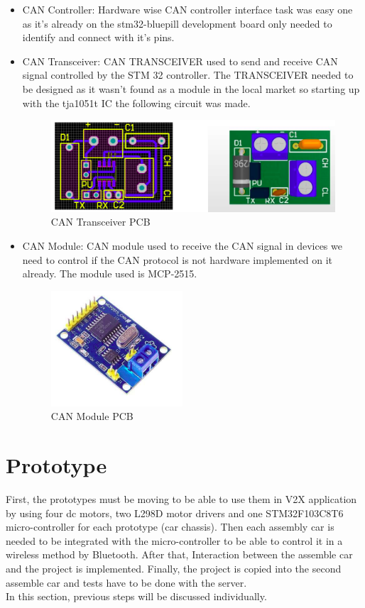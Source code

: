 \begin{itemize}
    \item CAN Controller: Hardware wise CAN controller interface task was easy one as it’s already on the stm32-bluepill development board only needed to identify and connect with it’s pins.
    \item CAN Transceiver: CAN TRANSCEIVER used to send and receive CAN signal controlled by the STM 32 controller.
The TRANSCEIVER needed to be designed as it wasn’t found as a module in the local market so starting up with the tja1051t IC the
following circuit was made.
\begin{figure}[h]
    \centering
    \includegraphics[scale=.5]{figures/9-8.png}
    \caption{CAN Transceiver PCB}
\end{figure}

    \item CAN Module: CAN module used to receive the CAN signal in devices we need to control if the
CAN protocol is not hardware implemented on it already.
The module used is MCP-2515.
    \begin{figure}[h]
    \centering
    \includegraphics[scale=.6]{figures/9-9.png}
    \caption{CAN Module PCB}
\end{figure}
\end{itemize}

\section{Prototype}
First, the prototypes must be moving to be able to use them in V2X application by using four dc motors, two L298D motor drivers and one STM32F103C8T6 micro-controller for each prototype (car chassis). Then each assembly car is needed to be integrated with the micro-controller to be able to control it in a wireless method by Bluetooth. After that, Interaction between the assemble car and the project is implemented. Finally, the project is copied into the second assemble car and tests have to be done with the server.\\
In this section, previous steps will be discussed individually.

